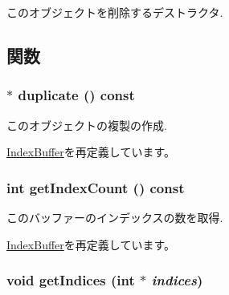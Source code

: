 このオブジェクトを削除するデストラクタ. 

\subsection{関数}
\hypertarget{classm3g_1_1TriangleStripArray_1623fbdfe91eb2e9d4a67bece6a46904}{
\subsubsection[{duplicate}]{ $\ast$ duplicate () const}}
\label{classm3g_1_1TriangleStripArray_1623fbdfe91eb2e9d4a67bece6a46904}


このオブジェクトの複製の作成. 

\hyperlink{classm3g_1_1IndexBuffer_fab6fc0a0ec393e527f849c3af10ad76}{IndexBuffer}を再定義しています。\hypertarget{classm3g_1_1TriangleStripArray_fe9ae2993ebcdb93d5ff26d57c81b73e}{
\subsubsection[{getIndexCount}]{\setlength{\rightskip}{0pt plus 5cm}int getIndexCount () const}}
\label{classm3g_1_1TriangleStripArray_fe9ae2993ebcdb93d5ff26d57c81b73e}


このバッファーのインデックスの数を取得. 

\hyperlink{classm3g_1_1IndexBuffer_fe9ae2993ebcdb93d5ff26d57c81b73e}{IndexBuffer}を再定義しています。\hypertarget{classm3g_1_1TriangleStripArray_650953afac45099025a524ab160b911f}{
\subsubsection[{getIndices}]{\setlength{\rightskip}{0pt plus 5cm}void getIndices (int $\ast$ {\em indices})}}
\label{classm3g_1_1TriangleStripArray_650953afac45099025a524ab160b911f}



